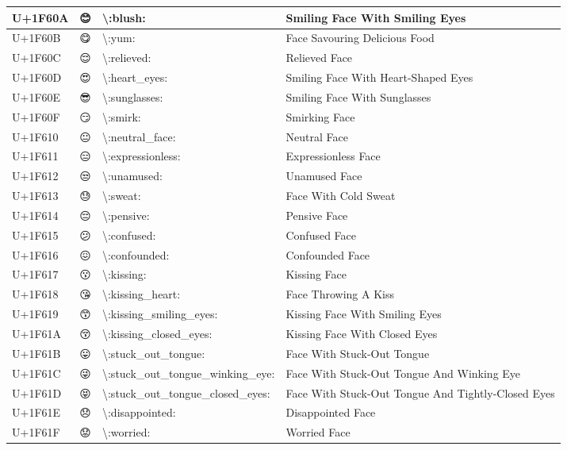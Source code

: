 \begin{table}[h]
\begin{tabulary}{\linewidth}{|L|L|L|L|}
\hline
U+1F60A & 😊 & {\textbackslash}:blush: & Smiling Face With Smiling Eyes \\
\hline
U+1F60B & 😋 & {\textbackslash}:yum: & Face Savouring Delicious Food \\
\hline
U+1F60C & 😌 & {\textbackslash}:relieved: & Relieved Face \\
\hline
U+1F60D & 😍 & {\textbackslash}:heart\_eyes: & Smiling Face With Heart-Shaped Eyes \\
\hline
U+1F60E & 😎 & {\textbackslash}:sunglasses: & Smiling Face With Sunglasses \\
\hline
U+1F60F & 😏 & {\textbackslash}:smirk: & Smirking Face \\
\hline
U+1F610 & 😐 & {\textbackslash}:neutral\_face: & Neutral Face \\
\hline
U+1F611 & 😑 & {\textbackslash}:expressionless: & Expressionless Face \\
\hline
U+1F612 & 😒 & {\textbackslash}:unamused: & Unamused Face \\
\hline
U+1F613 & 😓 & {\textbackslash}:sweat: & Face With Cold Sweat \\
\hline
U+1F614 & 😔 & {\textbackslash}:pensive: & Pensive Face \\
\hline
U+1F615 & 😕 & {\textbackslash}:confused: & Confused Face \\
\hline
U+1F616 & 😖 & {\textbackslash}:confounded: & Confounded Face \\
\hline
U+1F617 & 😗 & {\textbackslash}:kissing: & Kissing Face \\
\hline
U+1F618 & 😘 & {\textbackslash}:kissing\_heart: & Face Throwing A Kiss \\
\hline
U+1F619 & 😙 & {\textbackslash}:kissing\_smiling\_eyes: & Kissing Face With Smiling Eyes \\
\hline
U+1F61A & 😚 & {\textbackslash}:kissing\_closed\_eyes: & Kissing Face With Closed Eyes \\
\hline
U+1F61B & 😛 & {\textbackslash}:stuck\_out\_tongue: & Face With Stuck-Out Tongue \\
\hline
U+1F61C & 😜 & {\textbackslash}:stuck\_out\_tongue\_winking\_eye: & Face With Stuck-Out Tongue And Winking Eye \\
\hline
U+1F61D & 😝 & {\textbackslash}:stuck\_out\_tongue\_closed\_eyes: & Face With Stuck-Out Tongue And Tightly-Closed Eyes \\
\hline
U+1F61E & 😞 & {\textbackslash}:disappointed: & Disappointed Face \\
\hline
U+1F61F & 😟 & {\textbackslash}:worried: & Worried Face \\

\end{tabulary}
\end{table}
